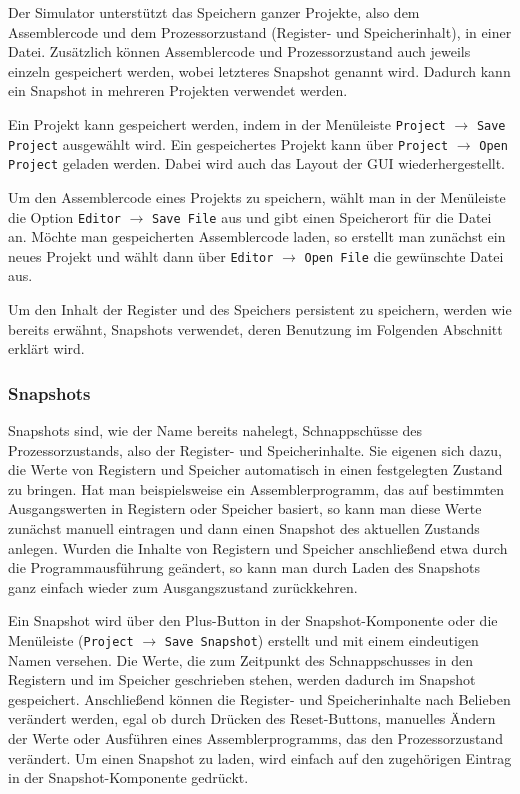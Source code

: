 Der Simulator unterstützt das Speichern ganzer Projekte, also dem Assemblercode
und dem Prozessorzustand (Register- und Speicherinhalt), in einer Datei.
Zusätzlich können Assemblercode und Prozessorzustand auch jeweils einzeln
gespeichert werden, wobei letzteres Snapshot genannt wird. Dadurch kann ein
Snapshot in mehreren Projekten verwendet werden.

Ein Projekt kann gespeichert werden, indem in der Menüleiste \texttt{Project}
$\rightarrow$ \texttt{Save Project} ausgewählt wird. Ein gespeichertes Projekt
kann über \texttt{Project} $\rightarrow$ \texttt{Open Project} geladen werden.
Dabei wird auch das Layout der GUI wiederhergestellt.

Um den Assemblercode eines Projekts zu speichern, wählt man in der Menüleiste die
Option \texttt{Editor} $\rightarrow$ \texttt{Save File} aus und gibt einen Speicherort für
die Datei an. Möchte man gespeicherten Assemblercode laden, so erstellt man zunächst ein neues
Projekt und wählt dann über \texttt{Editor} $\rightarrow$ \texttt{Open File} die
gewünschte Datei aus.

Um den Inhalt der Register und des Speichers persistent zu speichern, werden wie
bereits erwähnt, Snapshots verwendet, deren Benutzung im Folgenden Abschnitt
erklärt wird.

\subsubsection{Snapshots}

Snapshots sind, wie der Name bereits nahelegt, Schnappschüsse des
Prozessorzustands, also der Register- und Speicherinhalte. Sie eigenen sich
dazu, die Werte von Registern und Speicher automatisch in einen festgelegten
Zustand zu bringen. Hat man beispielsweise ein Assemblerprogramm, das auf
bestimmten Ausgangswerten in Registern oder Speicher basiert, so kann man diese
Werte zunächst manuell eintragen und dann einen Snapshot des aktuellen Zustands
anlegen. Wurden die Inhalte von Registern und Speicher anschließend etwa durch
die Programmausführung geändert, so kann man durch Laden des Snapshots ganz
einfach wieder zum Ausgangszustand zurückkehren.

Ein Snapshot wird über den Plus-Button in der Snapshot-Komponente oder die
Menüleiste (\texttt{Project} $\rightarrow$ \texttt{Save Snapshot}) erstellt und mit einem
eindeutigen Namen versehen. Die Werte, die zum Zeitpunkt des Schnappschusses in
den Registern und im Speicher geschrieben stehen, werden dadurch im Snapshot
gespeichert. Anschließend können die Register- und Speicherinhalte nach Belieben
verändert werden, egal ob durch Drücken des Reset-Buttons, manuelles Ändern der
Werte oder Ausführen eines Assemblerprogramms, das den Prozessorzustand
verändert. Um einen Snapshot zu laden, wird einfach auf den zugehörigen Eintrag
in der Snapshot-Komponente gedrückt.

